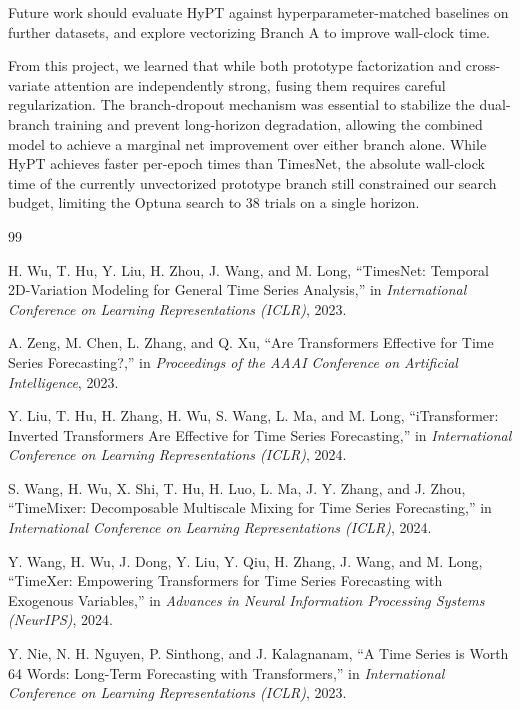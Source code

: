 \documentclass[10pt,journal]{IEEEtran}
\begin{document}
Future work should evaluate HyPT against hyperparameter-matched baselines on further datasets, and explore vectorizing Branch A to improve wall-clock time.

From this project, we learned that while both prototype factorization and cross-variate attention are independently strong, fusing them requires careful regularization. The branch-dropout mechanism was essential to stabilize the dual-branch training and prevent long-horizon degradation, allowing the combined model to achieve a marginal net improvement over either branch alone. While HyPT achieves faster per-epoch times than TimesNet, the absolute wall-clock time of the currently unvectorized prototype branch still constrained our search budget, limiting the Optuna search to 38 trials on a single horizon.

\begin{thebibliography}{99}

H. Wu, T. Hu, Y. Liu, H. Zhou, J. Wang, and M. Long, ``TimesNet: Temporal 2D-Variation Modeling for General Time Series Analysis,'' in \emph{International Conference on Learning Representations (ICLR)}, 2023.

A. Zeng, M. Chen, L. Zhang, and Q. Xu, ``Are Transformers Effective for Time Series Forecasting?,'' in \emph{Proceedings of the AAAI Conference on Artificial Intelligence}, 2023.

Y. Liu, T. Hu, H. Zhang, H. Wu, S. Wang, L. Ma, and M. Long, ``iTransformer: Inverted Transformers Are Effective for Time Series Forecasting,'' in \emph{International Conference on Learning Representations (ICLR)}, 2024.

S. Wang, H. Wu, X. Shi, T. Hu, H. Luo, L. Ma, J. Y. Zhang, and J. Zhou, ``TimeMixer: Decomposable Multiscale Mixing for Time Series Forecasting,'' in \emph{International Conference on Learning Representations (ICLR)}, 2024.

Y. Wang, H. Wu, J. Dong, Y. Liu, Y. Qiu, H. Zhang, J. Wang, and M. Long, ``TimeXer: Empowering Transformers for Time Series Forecasting with Exogenous Variables,'' in \emph{Advances in Neural Information Processing Systems (NeurIPS)}, 2024.

Y. Nie, N. H. Nguyen, P. Sinthong, and J. Kalagnanam, ``A Time Series is Worth 64 Words: Long-Term Forecasting with Transformers,'' in \emph{International Conference on Learning Representations (ICLR)}, 2023.


\end{thebibliography}
\end{document}
